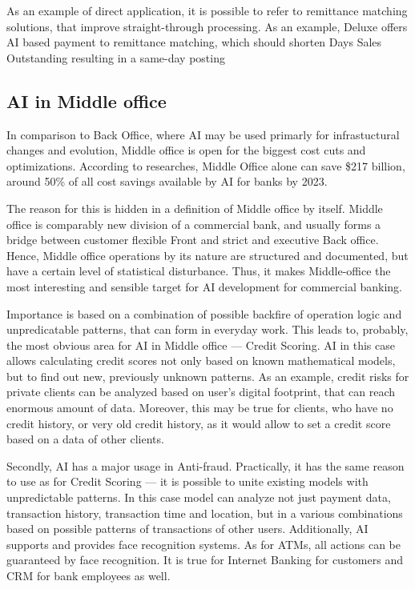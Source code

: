 As an example of direct application, it is possible to refer to remittance matching solutions, that improve straight-through processing.
As an example, Deluxe offers AI based payment to remittance matching, which should shorten Days Sales Outstanding resulting in a same-day posting
\cite{deluxe_ai_remittance}



\subsection{AI in Middle office}

In comparison to Back Office, where AI may be used primarly for infrastuctural changes and evolution, Middle office is open for the biggest cost cuts and optimizations.
According to researches, Middle Office alone can save \$217 billion, around 50\% of all cost savings available by AI for banks by 2023.
\cite{trillion_opportunity}

The reason for this is hidden in a definition of Middle office by itself.
Middle office is comparably new division of a commercial bank, and usually forms a bridge between customer flexible Front and strict and executive Back office.
Hence, Middle office operations by its nature are structured and documented, but have a certain level of statistical disturbance.
Thus, it makes Middle-office the most interesting and sensible target for AI development for commercial banking.

Importance is based on a combination of possible backfire of operation logic and unpredicatable patterns, that can form in everyday work.
This leads to, probably, the most obvious area for AI in Middle office — Credit Scoring.
AI in this case allows calculating credit scores not only based on known mathematical models, but to find out new, previously unknown patterns.
As an example, credit risks for private clients can be analyzed based on user's digital footprint, that can reach enormous amount of data.
Moreover, this may be true for clients, who have no credit history, or very old credit history, as it would allow to set a credit score based on a data of other clients.

Secondly, AI has a major usage in Anti-fraud.
Practically, it has the same reason to use as for Credit Scoring — it is possible to unite existing models with unpredictable patterns.
In this case model can analyze not just payment data, transaction history, transaction time and location, but in a various combinations based on possible patterns of transactions of other users.
Additionally, AI supports and provides face recognition systems.
As for ATMs, all actions can be guaranteed by face recognition.
It is true for Internet Banking for customers and CRM for bank employees as well.

